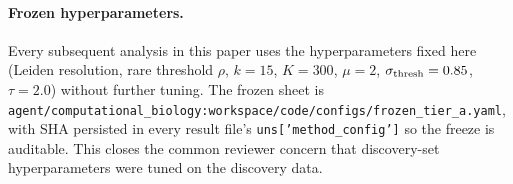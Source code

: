 \paragraph{Frozen hyperparameters.} Every subsequent analysis in this paper uses the hyperparameters fixed here (Leiden resolution, rare threshold $\rho$, $k=15$, $K=300$, $\mu=2$, $\sigma_{\rm thresh}=0.85$, $\tau=2.0$) without further tuning.  The frozen sheet is \texttt{agent/computational\_biology:workspace/code/configs/frozen\_tier\_a.yaml}, with SHA persisted in every result file's \texttt{uns['method\_config']} so the freeze is auditable.  This closes the common reviewer concern that discovery-set hyperparameters were tuned on the discovery data.
